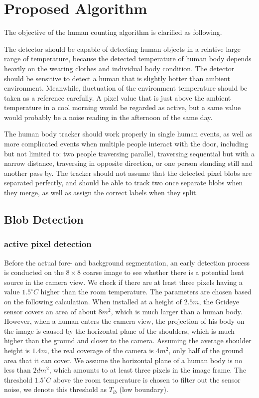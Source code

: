 \chapter{Proposed Algorithm}\label{ch:algorithm}
The objective of the human counting algorithm is clarified as following.
 
The detector should be capable of detecting human objects in a relative large range of temperature, because the detected temperature of human body depends heavily on the wearing clothes and individual body condition. The detector should be sensitive to detect a human that is slightly hotter than ambient environment. Meanwhile, fluctuation of the environment temperature should be taken as a reference carefully. A pixel value that is just above the ambient temperature in a cool morning would be regarded as active, but a same value would probably be a noise reading in the afternoon of the same day.

The human body tracker should work properly in single human events, as well as more complicated events when multiple people interact with the door, including but not limited to: two people traversing parallel, traversing sequential but with a narrow distance, traversing in opposite direction, or one person standing still and another pass by. The tracker should not assume that the detected pixel blobs are separated perfectly, and should be able to track two once separate blobs when they merge, as well as assign the correct labels when they split.
\section{Blob Detection}
\subsection{active pixel detection}
Before the actual fore- and background segmentation, an early detection process is conducted on the $8\times8$ coarse image to see whether there is a potential heat source in the camera view. We check if there are at least three pixels having a value $1.5^\circ C$ higher than the room temperature. The parameters are chosen based on the following calculation. When installed at a height of $2.5m$, the Grideye sensor covers an area of about $8m^2$, which is much larger than a human body. However, when a human enters the camera view, the projection of his body on the image is caused by the horizontal plane of the shoulders, which is much higher than the ground and closer to the camera. Assuming the average shoulder height is $1.4m$, the real coverage of the camera is $4m^2$, only half of the ground area that it can cover. We assume the horizontal plane of a human body is no less than $2dm^2$, which amounts to at least three pixels in the image frame. The threshold $1.5^\circ C$ above the room temperature is chosen to filter out the sensor noise, we denote this threshold as $T_{lb}$ (low boundary).
